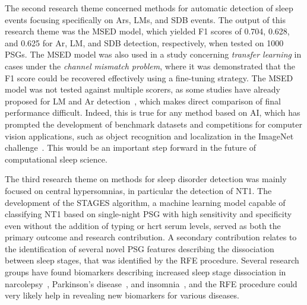 The second research theme concerned methods for automatic detection of sleep events focusing specifically on \acp{Ar}, \acp{LM}, and \ac{SDB} events.
The output of this research theme was the \ac{MSED} model, which yielded F1 scores of 0.704, 0.628, and 0.625 for \ac{Ar}, \ac{LM}, and \ac{SDB} detection, respectively, when tested on 1000 \acp{PSG}.
The \ac{MSED} model was also used in a study concerning \emph{transfer learning} in cases under the \emph{channel mismatch problem}, where it was demonstrated that the F1 score could be recovered effectively using a fine-tuning strategy.
The \ac{MSED} model was not tested against multiple scorers, as some studies have already proposed for \ac{LM} and \ac{Ar} detection~\cite{Carvelli2020, Brink-Kjaer2020}, which makes direct comparison of final performance difficult.
Indeed, this is true for any method based on \ac{AI}, which has prompted the development of benchmark datasets and competitions for computer vision applications, such as object recognition and localization in the ImageNet challenge~\cite{Russakovsky2015}.
This would be an important step forward in the future of computational sleep science.



The third research theme on methods for sleep disorder detection was mainly focused on central hypersomnias, in particular the detection of \ac{NT1}.
The development of the \ac{STAGES} algorithm, a machine learning model capable of classifying \ac{NT1} based on single-night \ac{PSG} with high sensitivity and specificity even without the addition of \hla typing or \ac{hcrt} serum levels, served as both the primary outcome and research contribution.
A secondary contribution relates to the identification of several novel \ac{PSG} features describing the dissociation between sleep stages, that was identified by the \ac{RFE} procedure.
Several research groups have found biomarkers describing increased sleep stage dissociation in narcolepsy~\cite{Sorensen2013b, Jensen2014, Christensen2015a, Olsen2017}, Parkinson's disease~\cite{Koch2014, Christensen2014, Christensen2016}, and insomnia~\cite{Christensen2019}, and the \ac{RFE} procedure could very likely help in revealing new biomarkers for various diseases.

